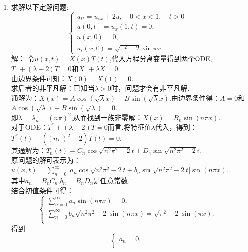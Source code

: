 \documentclass[11pt]{article}
\begin{document}
\begin{enumerate}
    \item 求解以下定解问题:\\
    \begin{equation*}
            \left\{
             \begin{array}{lr}
             u_{tt}=u_{xx}+2u,\quad 0<x<1,\quad t>0 &  \\
             u(0,t)=u_x(1,t)=0, & \\
             u(x,0)=0, &    \\
             u_t(x,0)=\sqrt {\pi^2-2}\sin\pi x. &
             \end{array}
            \right.
            \end{equation*}
    解： 令$u(x,t)=X(x)T(t)$,代入方程分离变量得到两个ODE,$T^{''}+(\lambda-2) T=0$和$X^{''}+\lambda X=0$.\\由边界条件可知：$X(0)=X(1)=0$.\\求后者的非平凡解：已知当$\lambda>0$时，问题才会有非平凡解.\\通解为：$X(x)=A\cos(\sqrt{\lambda}x)+B\sin(\sqrt {\lambda}x)$.由边界条件得：$A=0$和$A\cos(\sqrt {\lambda})+B\sin(\sqrt {\lambda})=0$.\\即$\lambda=\lambda_n=(n\pi)^2$,从而找到一族非零解：$X(x)=B_n\sin(n\pi x)$.
        \\对于ODE：$T^{''}+(\lambda-2) T=0$而言,将特征值$\lambda$代入，得到：$T^{''}(t)-((n\pi)^2-2)T(t)=0$.\\其通解为：$T_n(t)=C_{n}\cos\sqrt {n^2\pi^2-2}t+D_n\sin\sqrt {n^2\pi^2-2}t$.\\原问题的解可表示为：$u(x,t)=\sum_{n=0}^{\infty}\big[a_{n}\cos\sqrt {n^2\pi^2-2}t+b_n\sin\sqrt {n^2\pi^2-2}t]\sin(n\pi x)$.\\其中$a_n=B_{n}C_n$,\quad $b_n=B_nD_n$是任意常数.\\结合初值条件可得：\begin{equation*}
            \left\{
             \begin{array}{lr}
             \sum_{n=0}^{\infty}a_{n}\sin (n\pi x)=0, &  \\
             \sum_{n=0}^{\infty}b_n\sqrt {n^2\pi^2-2}\sin (n\pi x)=\sqrt {\pi^2-2}\sin(\pi x). & \\
             \end{array}
            \right.
            \end{equation*}
    得到\begin{equation*}
            \left\{
             \begin{array}{lr}
             a_n=0, &  \\

\end{array}
\end{equation*}
\end{enumerate}
\end{document}

